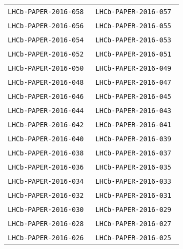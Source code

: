 \begin{center}
\begin{longtable}{ll}
\texttt{LHCb-PAPER-2016-058}~\cite{LHCb-PAPER-2016-058} & 
\texttt{LHCb-PAPER-2016-057}~\cite{LHCb-PAPER-2016-057} \\
\texttt{LHCb-PAPER-2016-056}~\cite{LHCb-PAPER-2016-056} & 
\texttt{LHCb-PAPER-2016-055}~\cite{LHCb-PAPER-2016-055} \\
\texttt{LHCb-PAPER-2016-054}~\cite{LHCb-PAPER-2016-054} & 
\texttt{LHCb-PAPER-2016-053}~\cite{LHCb-PAPER-2016-053} \\
\texttt{LHCb-PAPER-2016-052}~\cite{LHCb-PAPER-2016-052} & 
\texttt{LHCb-PAPER-2016-051}~\cite{LHCb-PAPER-2016-051} \\
\texttt{LHCb-PAPER-2016-050}~\cite{LHCb-PAPER-2016-050} & 
\texttt{LHCb-PAPER-2016-049}~\cite{LHCb-PAPER-2016-049} \\
\texttt{LHCb-PAPER-2016-048}~\cite{LHCb-PAPER-2016-048} & 
\texttt{LHCb-PAPER-2016-047}~\cite{LHCb-PAPER-2016-047} \\
\texttt{LHCb-PAPER-2016-046}~\cite{LHCb-PAPER-2016-046} & 
\texttt{LHCb-PAPER-2016-045}~\cite{LHCb-PAPER-2016-045} \\
\texttt{LHCb-PAPER-2016-044}~\cite{LHCb-PAPER-2016-044} & 
\texttt{LHCb-PAPER-2016-043}~\cite{LHCb-PAPER-2016-043} \\
\texttt{LHCb-PAPER-2016-042}~\cite{LHCb-PAPER-2016-042} & 
\texttt{LHCb-PAPER-2016-041}~\cite{LHCb-PAPER-2016-041} \\
\texttt{LHCb-PAPER-2016-040}~\cite{LHCb-PAPER-2016-040} & 
\texttt{LHCb-PAPER-2016-039}~\cite{LHCb-PAPER-2016-039} \\
\texttt{LHCb-PAPER-2016-038}~\cite{LHCb-PAPER-2016-038} & 
\texttt{LHCb-PAPER-2016-037}~\cite{LHCb-PAPER-2016-037} \\
\texttt{LHCb-PAPER-2016-036}~\cite{LHCb-PAPER-2016-036} & 
\texttt{LHCb-PAPER-2016-035}~\cite{LHCb-PAPER-2016-035} \\
\texttt{LHCb-PAPER-2016-034}~\cite{LHCb-PAPER-2016-034} & 
\texttt{LHCb-PAPER-2016-033}~\cite{LHCb-PAPER-2016-033} \\
\texttt{LHCb-PAPER-2016-032}~\cite{LHCb-PAPER-2016-032} & 
\texttt{LHCb-PAPER-2016-031}~\cite{LHCb-PAPER-2016-031} \\
\texttt{LHCb-PAPER-2016-030}~\cite{LHCb-PAPER-2016-030} & 
\texttt{LHCb-PAPER-2016-029}~\cite{LHCb-PAPER-2016-029} \\
\texttt{LHCb-PAPER-2016-028}~\cite{LHCb-PAPER-2016-028} & 
\texttt{LHCb-PAPER-2016-027}~\cite{LHCb-PAPER-2016-027} \\
\texttt{LHCb-PAPER-2016-026}~\cite{LHCb-PAPER-2016-026} &
\texttt{LHCb-PAPER-2016-025}~\cite{LHCb-PAPER-2016-025} \\

\end{longtable}
\end{center}
